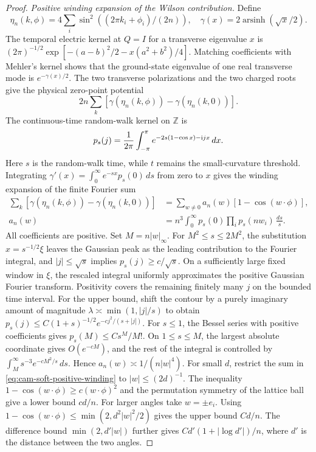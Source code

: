 \documentclass[11pt,a4paper]{article}
\numberwithin{equation}{section}
\begin{document}
\begin{proof}
\emph{Positive winding expansion of the Wilson contribution.}
Define
\[
 \eta_n(k,\phi)=4\sum_i \sin^2((2\pi k_i+\phi_i)/(2n)),
 \quad \gamma(x)=2\operatorname{arsinh}(\sqrt x/2).
\]
The temporal electric kernel at \(Q=I\) for a transverse eigenvalue \(x\) is
\((2\pi)^{-1/2}\exp[-(a-b)^2/2-x(a^2+b^2)/4]\).
Matching coefficients with Mehler's kernel shows that the ground-state eigenvalue of one real transverse mode is \(e^{-\gamma(x)/2}\). The two transverse polarizations and the two charged roots give the physical zero-point potential
\[
  2n \sum_k[\gamma(\eta_n(k,\phi))-\gamma(\eta_n(k,0))].
\]
The continuous-time random-walk kernel on \(\mathbb Z\) is
\[
 p_s(j)=\frac{1}{2\pi}\int_{-\pi}^{\pi}
       e^{-2s(1-\cos x)-{\rm i}jx}\,dx .
\]
Here \(s\) is the random-walk time, while \(t\) remains the small-curvature threshold. Integrating \(\gamma'(x)=\int_0^\infty e^{-sx}p_s(0)\,ds\) from zero to \(x\) gives the winding expansion of the finite Fourier sum
\begin{equation}
 \begin{aligned}
 \sum_k[\gamma(\eta_n(k,\phi))-\gamma(\eta_n(k,0))]
 &=\sum_{w\ne0} a_n(w)[1-\cos(w\cdot\phi)],\\
 a_n(w)&=n^3\int_0^\infty p_s(0)\prod_i p_s(nw_i)\,\frac{ds}{s}.
 \end{aligned}
 \label{eq:cam-soft-positive-winding}
\end{equation}
All coefficients are positive. Set \(M=n|w|_\infty\). For \(M^2\le s\le2M^2\), the substitution \(x=s^{-1/2}\xi\) leaves the Gaussian peak as the leading contribution to the Fourier integral, and \(|j|\le \sqrt s\) implies \(p_s(j)\ge c/\sqrt s\). On a sufficiently large fixed window in \(\xi\), the rescaled integral uniformly approximates the positive Gaussian Fourier transform. Positivity covers the remaining finitely many \(j\) on the bounded time interval. For the upper bound, shift the contour by a purely imaginary amount of magnitude \(\lambda\asymp\min(1,|j|/s)\) to obtain
\(p_s(j)\le C(1+s)^{-1/2}e^{-c j^2/(s+|j|)}\). For \(s\le1\), the Bessel series with positive coefficients gives \(p_s(M)\le Cs^M/M!\). On \(1\le s\le M\), the largest absolute coordinate gives \(O(e^{-cM})\), and the rest of the integral is controlled by \(\int_M^\infty s^{-3}e^{-cM^2/s}\,ds\). Hence
\(a_n(w)\asymp 1/(n|w|^4)\).
For small \(d\), restrict the sum in \eqref{eq:cam-soft-positive-winding} to \(|w|\le(2d)^{-1}\). The inequality \(1-\cos(w\cdot\phi)\ge c(w\cdot\phi)^2\) and the permutation symmetry of the lattice ball give a lower bound \(cd/n\). For larger angles take \(w=\pm e_i\). Using \(1-\cos(w\cdot\phi)\le\min(2,d^2|w|^2/2)\) gives the upper bound \(Cd/n\). The difference bound \(\min(2,d'|w|)\) further gives \(C d'(1+|\log d'|)/n\), where \(d'\) is the distance between the two angles.


\end{proof}
\end{document}
